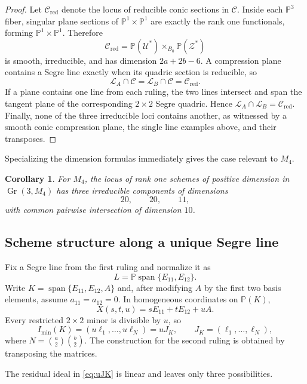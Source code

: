 \documentclass[11pt]{amsart}
\newcommand{\chg}[1]{#1}
\newcommand{\Gr}{\operatorname{Gr}}
\newcommand{\Span}{\operatorname{span}}
\theoremstyle{plain}
\newtheorem{corollary}[theorem]{Corollary}
\theoremstyle{definition}
\theoremstyle{remark}
\begin{document}
\begin{proof}
{Let $\mathcal C_{\mathrm{red}}$ denote the locus of reducible conic sections in $\mathcal C$.}
Inside each $\mathbb P^3$ fiber, singular plane sections of $\mathbb P^1\times\mathbb P^1$ are exactly the \chg{rank one} functionals, forming $\mathbb P^1\times\mathbb P^1$. Therefore
\[
{\mathcal C_{\mathrm{red}}}
=\mathbb P(\mathcal U^*)\times_{B_0}\mathbb P(\mathcal Z^*)
\]
is smooth, irreducible, and has dimension $2a+2b-6$. A compression plane contains a Segre line exactly when its quadric section is reducible, so
\[
\mathcal L_A\cap\mathcal C
=\mathcal L_B\cap\mathcal C
={\mathcal C_{\mathrm{red}}}.
\]
If a plane contains one line from each ruling, the two lines intersect and span the tangent plane of the corresponding $2\times2$ Segre quadric. Hence $\mathcal L_A\cap\mathcal L_B={\mathcal C_{\mathrm{red}}}$. Finally, none of the three irreducible loci contains another, as witnessed by a \chg{smooth conic compression plane}, the \chg{single line examples} above, and their transposes.
\end{proof}

\chg{Specializing the dimension formulas immediately gives the case relevant to $M_4$.}

\begin{corollary}\label{cor:M4-components}
For $M_4$, the \chg{locus of rank one schemes of positive dimension} in $\Gr(3,M_4)$ has three irreducible components of dimensions
\[
20,\qquad20,\qquad11,
\]
with common pairwise intersection of dimension $10$.
\end{corollary}

\subsection{Scheme structure along a unique Segre line}

Fix a Segre line from the first ruling and normalize it as
\[
L=\mathbb P\Span\{E_{11},E_{12}\}.
\]
Write $K=\Span\{E_{11},E_{12},A\}$ and, after modifying $A$ by the first two basis elements, assume $a_{11}=a_{12}=0$. In homogeneous coordinates on $\mathbb P(K)$,
\[
X(s,t,u)=sE_{11}+tE_{12}+uA.
\]
Every restricted $2\times2$ minor is divisible by $u$, so
\begin{equation}\label{eq:uJK}
{I_{\min}(K)}
=(u\ell_1,\ldots,u\ell_N)=uJ_K,
\qquad
J_K=(\ell_1,\ldots,\ell_N),
\end{equation}
where $N=\binom a2\binom b2$. {The construction for the second ruling is obtained by transposing the matrices.}

\chg{The residual ideal in \eqref{eq:uJK} is linear and leaves only three possibilities.}
\end{document}
